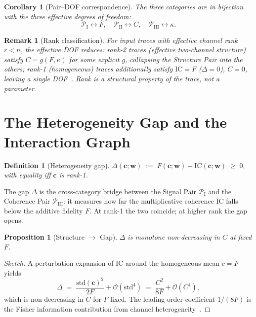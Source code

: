 \documentclass[
  aps,
  prd,
  twocolumn,
  superscriptaddress,
  nofootinbib,
  floatfix
]{revtex4-2}
\newtheorem{definition}[theorem]{Definition}
\newtheorem{corollary}[theorem]{Corollary}
\newtheorem{proposition}[theorem]{Proposition}
\newtheorem{remark}{Remark}
\newcommand{\tvec}{\mathbf{c}}
\newcommand{\wvec}{\mathbf{w}}
\newcommand{\IC}{\mathrm{IC}}
\newcommand{\stddev}{\mathrm{std}}
\begin{document}
\begin{corollary}[Pair--DOF correspondence]
The three categories are in bijection with the three effective
degrees of freedom:
\begin{equation}
  \mathcal{P}_{\mathrm{I}}\leftrightarrow F,\quad
  \mathcal{P}_{\mathrm{II}}\leftrightarrow C,\quad
  \mathcal{P}_{\mathrm{III}}\leftrightarrow \kappa.
\end{equation}
\end{corollary}

\begin{remark}[Rank classification]
For input traces with effective channel rank $r<n$, the
effective DOF reduces: rank-2 traces (effective two-channel
structure) satisfy $C=g(F,\kappa)$ for some explicit $g$,
collapsing the Structure Pair into the others; rank-1
(homogeneous) traces additionally satisfy $\IC=F$
($\Delta=0$), $C=0$, leaving a single
DOF~\cite{paulus2026umcpcasepack}.  Rank is a structural
property of the trace, not a parameter.
\end{remark}

\section{The Heterogeneity Gap and the Interaction Graph}\label{sec:graph}

\begin{definition}[Heterogeneity gap]
$\Delta(\tvec;\wvec) \;:=\; F(\tvec;\wvec) - \IC(\tvec;\wvec) \;\geq\; 0,$
with equality iff $\tvec$ is rank-1.
\end{definition}

The gap $\Delta$ is the cross-category bridge between the Signal
Pair $\mathcal{P}_{\mathrm{I}}$ and the Coherence Pair
$\mathcal{P}_{\mathrm{III}}$: it measures how far the
multiplicative coherence $\IC$ falls below the additive fidelity
$F$.  At rank-1 the two coincide; at higher rank the gap opens.

\begin{proposition}[Structure $\to$ Gap]\label{prop:CtoDelta}
$\Delta$ is monotone non-decreasing in $C$ at fixed $F$.
\end{proposition}

\begin{proof}[Sketch]
A perturbation expansion of $\IC$ around the homogeneous mean
$\bar c = F$ yields
\begin{equation}\label{eq:Delta-expansion}
  \Delta \;=\; \frac{\stddev(\tvec)^2}{2F} + \mathcal{O}(\stddev^4)
        \;=\; \frac{C^2}{8F} + \mathcal{O}(C^4),
\end{equation}
which is non-decreasing in $C$ for $F$ fixed.  The
leading-order coefficient $1/(8F)$ is the Fisher information
contribution from channel heterogeneity~\cite{paulus2026umcpcasepack}.
\end{proof}
\end{document}
